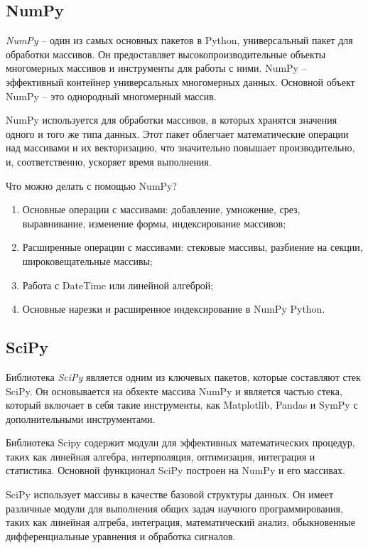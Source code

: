 \subsection{NumPy}

\textit{NumPy} -- один из самых основных пакетов в Python, универсальный пакет для обработки массивов. Он предоставляет высокопроизводительные объекты многомерных массивов и инструменты для работы с ними. NumPy -- эффективный контейнер универсальных многомерных данных. Основной объект NumPy -- это однородный многомерный массив.

NumPy используется для обработки массивов, в которых хранятся значения одного и того же типа данных. Этот пакет облегчает математические операции над массивами и их векторизацию, что значительно повышает производительно, и, соответственно, ускоряет время выполнения.

Что можно делать с помощью NumPy?

\begin{enumerate}
	\item Основные операции с массивами: добавление, умножение, срез, выравнивание, изменение формы, индексирование массивов;
	\item Расширенные операции с массивами: стековые массивы, разбиение на секции, широковещательные массивы;
	\item Работа с DateTime или линейной алгеброй;
	\item Основные нарезки и расширенное индексирование в NumPy Python.
\end{enumerate}

\subsection{SciPy}

Библиотека \textit{SciPy} является одним из ключевых пакетов, которые составляют стек SciPy. Он основывается на обхекте массива NumPy и является частью стека, который включает в себя такие инструменты, как Matplotlib, Pandas и SymPy с дополнительными инструментами.

Библиотека Scipy содержит модули для эффективных математических процедур, таких как линейная алгебра, интерполяция, оптимизация, интеграция и статистика. Основной функционал SciPy построен на NumPy и его массивах.

SciPy использует массивы в качестве базовой структуры данных. Он имеет различные модули для выполнения общих задач научного программирования, таких как линейная алгреба, интеграция, математический анализ, обыкновенные дифференциальные уравнения и обработка сигналов.

